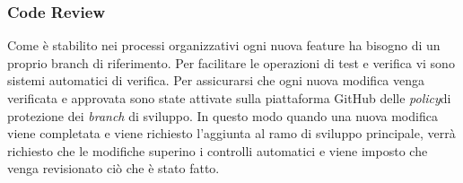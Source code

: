\subsubsection{Code Review}
Come è stabilito nei processi organizzativi ogni nuova feature ha bisogno di un
proprio branch di riferimento.
Per facilitare le operazioni di test e verifica vi sono sistemi automatici di verifica.
Per assicurarsi che ogni nuova modifica venga verificata e approvata sono state attivate
sulla piattaforma GitHub delle \textit{policy}\glo di protezione dei \textit{branch}\glo
di sviluppo.
In questo modo quando una nuova modifica viene completata e viene richiesto l'aggiunta
al ramo di sviluppo principale, verrà richiesto che le modifiche superino i controlli automatici
e viene imposto che venga revisionato ciò che è stato fatto.
